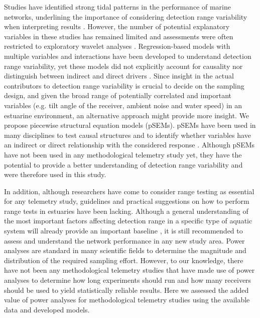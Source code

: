 \documentclass[doublespacing,linenumbers]{bmcart}
\begin{document}
Studies have identified strong tidal patterns in the performance of marine networks, underlining the importance of considering detection range variability when interpreting results \cite{Cho2016TidalDetection,Mathies2014}. However, the number of potential explanatory variables in these studies has remained limited and assessments were often restricted to exploratory wavelet analyses \cite{Cho2016TidalDetection,Mathies2014}. Regression-based models with multiple variables and interactions have been developed to understand detection range variability, yet these models did not explicitly account for causality nor distinguish between indirect and direct drivers \cite{Reubens2018}. Since insight in the actual contributors to detection range variability is crucial to decide on the sampling design, and given the broad range of potentially correlated and important variables (e.g. tilt angle of the receiver, ambient noise and water speed) in an estuarine environment, an alternative approach might provide more insight. We propose piecewise structural equation models (pSEMs). pSEMs have been used in many disciplines to test causal structures and to identify whether variables have an indirect or direct relationship with the considered response \cite{Lefcheck2016PiecewiseSEM:Systematics}. Although pSEMs have not been used in any methodological telemetry study yet, they have the potential to provide a better understanding of detection range variability and were therefore used in this study. 

In addition, although researchers have come to consider range testing as essential for any telemetry study, guidelines and practical suggestions on how to perform range tests in estuaries have been lacking. Although a general understanding of the most important factors affecting detection range in a specific type of aquatic system will already provide an important baseline \cite{Gjelland2013EnvironmentalTransmission}, it is still recommended to assess and understand the network performance in any new study area. Power analyses are standard in many scientific fields to determine the magnitude and distribution of the required sampling effort. However, to our knowledge, there have not been any methodological telemetry studies that have made use of power analyses to determine how long experiments should run and how many receivers should be used to yield statistically reliable results. Here we assessed the added value of power analyses for methodological telemetry studies using the available data and developed models.  
\end{document}
